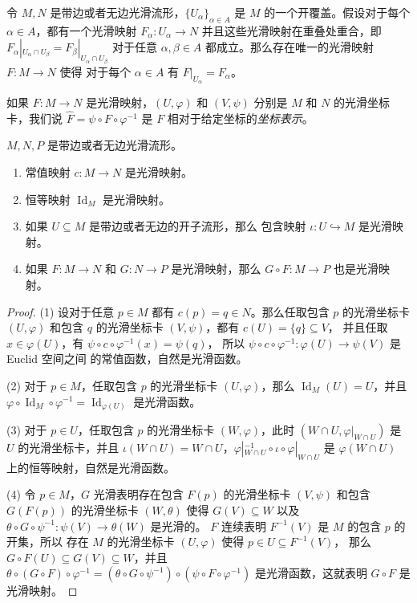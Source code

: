 \documentclass[fontset=none]{Notes}
\DeclareMathOperator\Id{Id}
\begin{document}
\begin{corollary}[光滑映射的粘合引理]
  令 $M,N$ 是带边或者无边光滑流形，$\{U_\alpha\}_{\alpha\in A}$ 是 $M$ 
  的一个开覆盖。假设对于每个 $\alpha\in A$，都有一个光滑映射 $F_\alpha:U_\alpha\to N$
  并且这些光滑映射在重叠处重合，即 $F_\alpha|_{U_\alpha\cap U_\beta}=F_\beta|_{U_\alpha\cap U_\beta}$
  对于任意 $\alpha,\beta\in A$ 都成立。那么存在唯一的光滑映射 $F:M\to N$ 使得
  对于每个 $\alpha\in A$ 有 $F|_{U_\alpha}=F_\alpha$。
\end{corollary}

如果 $F:M\to N$ 是光滑映射，$(U,\varphi)$ 和 $(V,\psi)$ 分别是 $M$ 和 $N$
的光滑坐标卡，我们说 $\hat F=\psi\circ F\circ\varphi^{-1}$ 是 $F$
相对于给定坐标的\emph{坐标表示}。

\begin{proposition}
  $M,N,P$ 是带边或者无边光滑流形。
  \begin{enumerate}
    \item 常值映射 $c:M\to N$ 是光滑映射。
    \item 恒等映射 $\Id_M$ 是光滑映射。
    \item 如果 $U\subseteq M$ 是带边或者无边的开子流形，那么
    包含映射 $\iota:U\hookrightarrow M$ 是光滑映射。
    \item 如果 $F:M\to N$ 和 $G:N\to P$ 是光滑映射，那么
    $G\circ F:M\to P$ 也是光滑映射。
  \end{enumerate}
\end{proposition}
\begin{proof}
  (1) 设对于任意 $p\in M$ 都有 $c(p)=q\in N$。那么任取包含 $p$ 的光滑坐标卡 $(U,\varphi)$
  和包含 $q$ 的光滑坐标卡 $(V,\psi)$，都有 $c(U)=\{q\}\subseteq V$，
  并且任取 $x\in\varphi(U)$，有 $\psi\circ c\circ \varphi^{-1}(x)=\psi(q)$，
  所以 $\psi\circ c\circ\varphi^{-1}:\varphi(U)\to\psi(V)$ 是 Euclid 空间之间
  的常值函数，自然是光滑函数。

  (2) 对于 $p\in M$，任取包含 $p$ 的光滑坐标卡 $(U,\varphi)$，那么
  $\Id_M(U)=U$，并且 $\varphi\circ\Id_M\circ\varphi^{-1}=\Id_{\varphi(U)}$
  是光滑函数。

  (3) 对于 $p\in U$，任取包含 $p$ 的光滑坐标卡 $(W,\varphi)$，此时 
  $(W\cap U,\varphi|_{W\cap U})$ 是 $U$ 的光滑坐标卡，并且
  $\iota(W\cap U)=W\cap U$，$\varphi|_{W\cap U}^{-1}\circ \iota\circ\varphi|_{W\cap U}$
  是 $\varphi(W\cap U)$ 上的恒等映射，自然是光滑函数。

  (4) 令 $p\in M$，$G$ 光滑表明存在包含 $F(p)$ 的光滑坐标卡 $(V,\psi)$
  和包含 $G(F(p))$ 的光滑坐标卡 $(W,\theta)$ 使得 $G(V)\subseteq W$
  以及 $\theta\circ G\circ\psi^{-1}:\psi(V)\to \theta(W)$ 是光滑的。
  $F$ 连续表明 $F^{-1}(V)$ 是 $M$ 的包含 $p$ 的开集，所以
  存在 $M$ 的光滑坐标卡 $(U,\varphi)$ 使得 $p\in U\subseteq F^{-1}(V)$，
  那么 $G\circ F(U)\subseteq G(V)\subseteq W$，并且
  $\theta\circ (G\circ F)\circ \varphi^{-1}=(\theta\circ G\circ \psi^{-1})
  \circ(\psi\circ F\circ\varphi^{-1})$ 是光滑函数，这就表明 $G\circ F$ 是光滑映射。
\end{proof}
\end{document}
